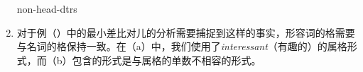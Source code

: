 \begin{enumerate}
{{      non-head-dtrs  \\
}}
\label{avm-max-lacht}
\item 对于例（）中的最小差比对儿的分析需要捕捉到这样的事实，形容词的格需要与名词的格保持一致。在（a）中，我们使用了\emph{interessant}（有趣的）的属格形式，而（b）包含的形式是与属格的单数不相容的形式。

\end{enumerate}
